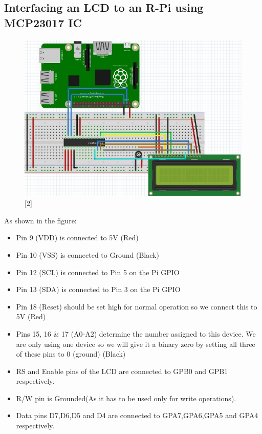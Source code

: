 \documentclass[11pt,a4paper]{article}
\begin{document}
    
    
    \newpage 
	\subsection{Interfacing an LCD to an R-Pi using MCP23017 IC}
	\begin{figure}[h!]
		\includegraphics[scale=0.7]{LCD_I2C.PNG}
		\centering
		\caption{[2]}
	\end{figure} 
	
	 As shown in the figure:
	 \begin{itemize}
	 	\item Pin 9 (VDD) is connected to 5V (Red)
	 	\item Pin 10 (VSS) is connected to Ground (Black)
	 	\item Pin 12 (SCL) is connected to Pin 5 on the Pi GPIO 
	 	\item Pin 13 (SDA) is connected to Pin 3 on the Pi GPIO 
	 	\item Pin 18 (Reset) should be set high for normal operation so we connect this to 5V (Red)
	 	\item Pins 15, 16 \& 17 (A0-A2) determine the number assigned to this device. We are only using one device so we will give it a binary zero by setting all three of these pins to 0 (ground) (Black)
	 	\item RS and Enable pins of the LCD are connected to GPB0 and GPB1 respectively.
	 	\item R/W pin is Grounded(As it has to be used only for write operations).
	 	\item Data pins D7,D6,D5 and D4 are connected to GPA7,GPA6,GPA5 and GPA4 respectively.
	 \end{itemize}
	
\end{document}
